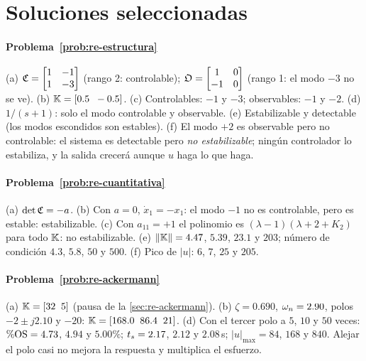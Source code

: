 \section{Soluciones seleccionadas}

\paragraph{Problema~\ref{prob:re-estructura}}
(a) $\mathfrak{C}=\begin{bmatrix}1&-1\\1&-3\end{bmatrix}$ (rango 2: controlable); $\mathfrak{O}=\begin{bmatrix}1&0\\-1&0\end{bmatrix}$ (rango 1: el modo $-3$ no se ve). (b) $\mathbb{K}=[0.5\;\;-0.5]$. (c) Controlables: $-1$ y $-3$; observables: $-1$ y $-2$. (d) $1/(s+1)$: solo el modo controlable y observable. (e) Estabilizable y detectable (los modos escondidos son estables). (f) El modo $+2$ es observable pero no controlable: el sistema es detectable pero \emph{no estabilizable}; ningún controlador lo estabiliza, y la salida crecerá aunque $u$ haga lo que haga.

\paragraph{Problema~\ref{prob:re-cuantitativa}}
(a) $\det\mathfrak{C}=-a$. (b) Con $a=0$, $\dot x_1=-x_1$: el modo $-1$ no es controlable, pero es estable: estabilizable. (c) Con $a_{11}=+1$ el polinomio es $(\lambda-1)(\lambda+2+K_2)$ para todo $\mathbb{K}$: no estabilizable. (e) $\|\mathbb{K}\|=4.47$, $5.39$, $23.1$ y $203$; número de condición $4.3$, $5.8$, $50$ y $500$. (f) Pico de $|u|$: $6$, $7$, $25$ y $205$.

\paragraph{Problema~\ref{prob:re-ackermann}}
(a) $\mathbb{K}=[32\;\;5]$ (pausa de la \cref{sec:re-ackermann}). (b) $\zeta=0.690$, $\omega_n=2.90$, polos $-2\pm j2.10$ y $-20$: $\mathbb{K}=[168.0\;\;86.4\;\;21]$. (d) Con el tercer polo a $5$, $10$ y $50$ veces: $\%\mathrm{OS}=4.73$, $4.94$ y $5.00\%$; $t_s=2.17$, $2.12$ y $2.08$\,s; $|u|_{\max}=84$, $168$ y $840$. Alejar el polo casi no mejora la respuesta y multiplica el esfuerzo.

